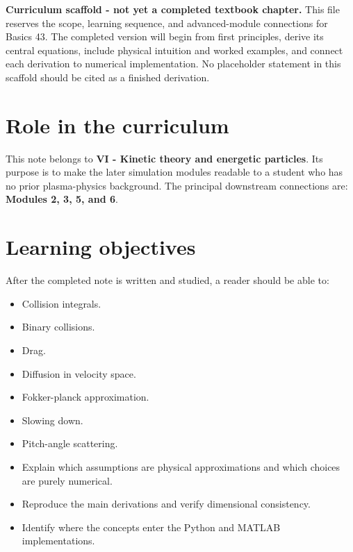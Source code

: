 \documentclass[11pt]{article}
\begin{document}

\begin{overviewbox}
\textbf{Curriculum scaffold - not yet a completed textbook chapter.} This file reserves the scope, learning sequence, and advanced-module connections for Basics 43. The completed version will begin from first principles, derive its central equations, include physical intuition and worked examples, and connect each derivation to numerical implementation. No placeholder statement in this scaffold should be cited as a finished derivation.
\end{overviewbox}

\ProjectTOC

\section{Role in the curriculum}
This note belongs to \textbf{VI - Kinetic theory and energetic particles}. Its purpose is to make the later simulation modules readable to a student who has no prior plasma-physics background. The principal downstream connections are: \textbf{Modules 2, 3, 5, and 6}.

\section{Learning objectives}
After the completed note is written and studied, a reader should be able to:
\begin{itemize}[leftmargin=1.6em]
\item Collision integrals.
\item Binary collisions.
\item Drag.
\item Diffusion in velocity space.
\item Fokker-planck approximation.
\item Slowing down.
\item Pitch-angle scattering.
\item Explain which assumptions are physical approximations and which choices are purely numerical.
\item Reproduce the main derivations and verify dimensional consistency.
\item Identify where the concepts enter the Python and MATLAB implementations.
\end{itemize}
\end{document}
